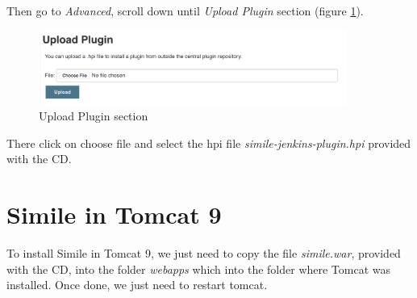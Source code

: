 Then go to \textit{Advanced}, scroll down until \textit{Upload Plugin} section (figure \ref{fig:jenkins-plugin-03}).

\begin{figure}[H]
	\centering
    \includegraphics[width=0.9\textwidth]{grafiken/jenkins-plugin-03}
    \caption{Upload Plugin section}
    \label{fig:jenkins-plugin-03}
\end{figure}

There click on choose file and select the hpi file \emph{simile-jenkins-plugin.hpi} provided with the CD.

\section{Simile in Tomcat 9}
To install Simile in Tomcat 9, we just need to copy the file \emph{simile.war}, provided with the CD, into the folder \emph{webapps} which into the folder where Tomcat was installed. Once done, we just need to restart tomcat.
